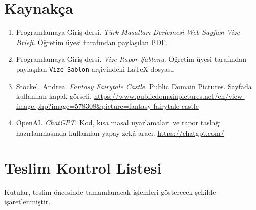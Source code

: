 \documentclass[12pt,a4paper]{article}
\begin{document}
\section{Kaynakça}

\begin{enumerate}

\item
Programlamaya Giriş dersi.
\textit{Türk Masalları Derlemesi Web Sayfası Vize Briefi}.
Öğretim üyesi tarafından paylaşılan PDF.

\item
Programlamaya Giriş dersi.
\textit{Vize Rapor Şablonu}.
Öğretim üyesi tarafından paylaşılan
\texttt{Vize\_Sablon} arşivindeki LaTeX dosyası.

\item
Stöckel, Andrea.
\textit{Fantasy Fairytale Castle}.
Public Domain Pictures.
Sayfada kullanılan kapak görseli.
\url{https://www.publicdomainpictures.net/en/view-image.php?image=578308&picture=fantasy-fairytale-castle}

\item
OpenAI.
\textit{ChatGPT}.
Kod, kısa masal uyarlamaları ve rapor taslağı
hazırlanmasında kullanılan yapay zekâ aracı.
\url{https://chatgpt.com/}

\end{enumerate}



\appendix
\section{Teslim Kontrol Listesi}

Kutular, teslim öncesinde tamamlanacak işlemleri
gösterecek şekilde işaretlenmiştir.
\end{document}
